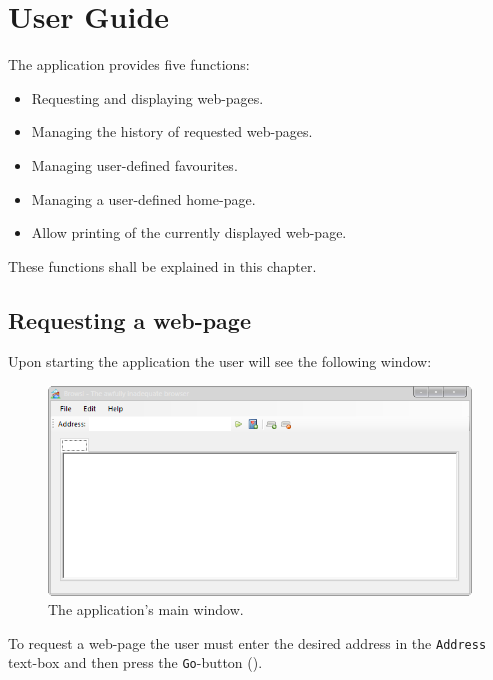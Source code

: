 \chapter{User Guide}\label{ch:user_guide} %

The application provides five functions:

\begin{itemize}
\item Requesting and displaying web-pages.
\item Managing the history of requested web-pages.
\item Managing user-defined favourites.
\item Managing a user-defined home-page.
\item Allow printing of the currently displayed web-page.
\end{itemize}

These functions shall be explained in this chapter.

\section{Requesting a web-page}
\label{sec:request_web_page}

Upon starting the application the user will see the following window:

\begin{figure}[H]
\begin{center}
\includegraphics[width=\textwidth]{gfx/main_window.png}
\caption{The application's main window.}
\label{fig:main_window}
\end{center}
\end{figure}

To request a web-page the user must enter the desired address in the \texttt{Address} text-box and then press the \texttt{Go}-button ().

